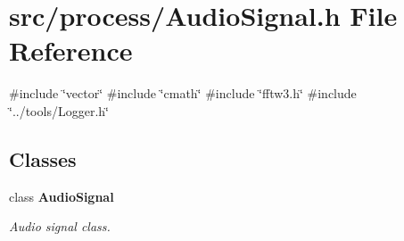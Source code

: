 \section{src/process/\+Audio\+Signal.h File Reference}
\label{_audio_signal_8h}
{\ttfamily \#include \char`\"{}vector\char`\"{}}\newline
{\ttfamily \#include \char`\"{}cmath\char`\"{}}\newline
{\ttfamily \#include \char`\"{}fftw3.\+h\char`\"{}}\newline
{\ttfamily \#include \char`\"{}../tools/\+Logger.\+h\char`\"{}}\newline
\subsection*{Classes}
\begin{DoxyCompactItemize}
\item 
class \textbf{ Audio\+Signal}
\begin{DoxyCompactList}\small\item\em Audio signal class. \end{DoxyCompactList}\end{DoxyCompactItemize}
